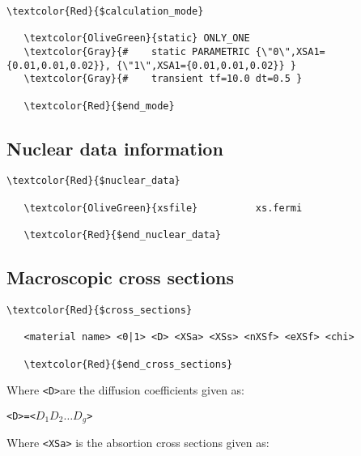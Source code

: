 \begin{Verbatim}[frame=single,commandchars=\\\{\}]
   \textcolor{Red}{$calculation_mode}

   \textcolor{OliveGreen}{static} ONLY_ONE
   \textcolor{Gray}{#    static PARAMETRIC {\"0\",XSA1={0.01,0.01,0.02}}, {\"1\",XSA1={0.01,0.01,0.02}} }
   \textcolor{Gray}{#    transient tf=10.0 dt=0.5 }

   \textcolor{Red}{$end_mode}
\end{Verbatim}


\subsection{Nuclear data information}

\begin{Verbatim}[frame=single,commandchars=\\\{\}]
   \textcolor{Red}{$nuclear_data}

   \textcolor{OliveGreen}{xsfile}          xs.fermi

   \textcolor{Red}{$end_nuclear_data}
\end{Verbatim}


\subsection{Macroscopic cross sections}


\begin{Verbatim}[frame=single,commandchars=\\\{\}]
   \textcolor{Red}{$cross_sections}

   <material name> <0|1> <D> <XSa> <XSs> <nXSf> <eXSf> <chi>

   \textcolor{Red}{$end_cross_sections}
\end{Verbatim}

\noindent
Where \verb|<D>|are the diffusion coefficients given as:

\begin{alltt}
   <D> = < \(D_{1}\) \(D_{2} \dots D_{g}\) >
\end{alltt}

\noindent
Where \verb|<XSa>| is the absortion cross sections given as:

